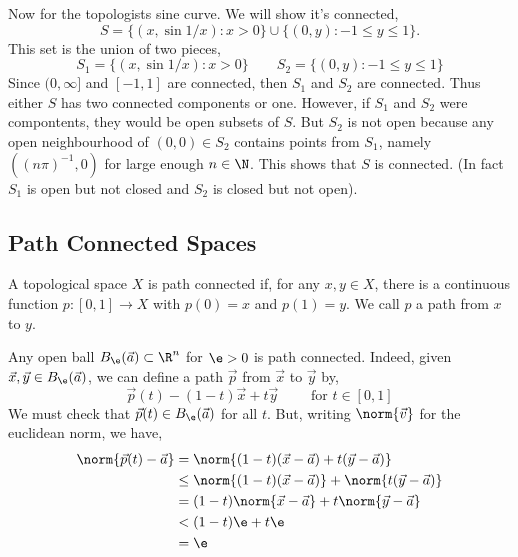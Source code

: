 \begin{eg}
  Now for the topologists sine curve. We will show it's connected,
  $$ S = \{(x, \sin 1/x) : x > 0\} \cup \{(0, y) : -1 \le y \le 1\}. $$
  This set is the union of two pieces,
  $$ S_1 = \{(x, \sin 1/x) : x > 0\} \qquad S_2 = \{(0, y) : -1 \le y \le 1\} $$
  Since $(0,\infty]$ and $[-1, 1]$ are connected, then $S_1$ and $S_2$ are connected. Thus either $S$ has two connected components or one. However, if $S_1$ and $S_2$ were compontents, they would be open subsets of $S$. But $S_2$ is not open because any open neighbourhood of $(0, 0) \in S_2$ contains points from $S_1$, namely $((n\pi)^{-1}, 0)$ for large enough $n \in \N$. This shows that $S$ is connected. (In fact $S_1$ is open but not closed and $S_2$ is closed but not open).
\end{eg}

\subsection{Path Connected Spaces}
\begin{ndefi}
  A topological space $X$ is path connected if, for any $x, y \in X$, there is a continuous function $p : [0, 1] \to X$ with $p(0) = x$ and $p(1) = y$. We call $p$ a path from $x$ to $y$.
\end{ndefi}

\begin{eg}
  Any open ball $B_\e(\vec a) \subset \R^n$ for $\e > 0$ is path connected. Indeed, given $\vec x, \vec y \in B_\e(\vec a)$, we can define a path $\vec p$ from $\vec x$ to $\vec y$ by,
  $$ \vec p(t) - (1 - t)\vec x + t\vec y \qquad \text{ for } t\in [0, 1] $$
  We must check that $\vec p (t) \in B_\e(\vec a)$ for all $t$. But, writing $\norm{\vec v}$ for the euclidean norm, we have,
  \begin{align*}
    \norm{\vec p(t) - \vec a} &= \norm{(1 - t)(\vec x - \vec a) + t(\vec y - \vec a)} \\
    &\le \norm{(1 - t)(\vec x - \vec a)} + \norm{t(\vec y - \vec a)} \\
    &= (1 - t)\norm{\vec x - \vec a} + t\norm{\vec y - \vec a}\\
    &< (1 - t)\e + t\e \\
    &= \e
  \end{align*}
\end{eg}